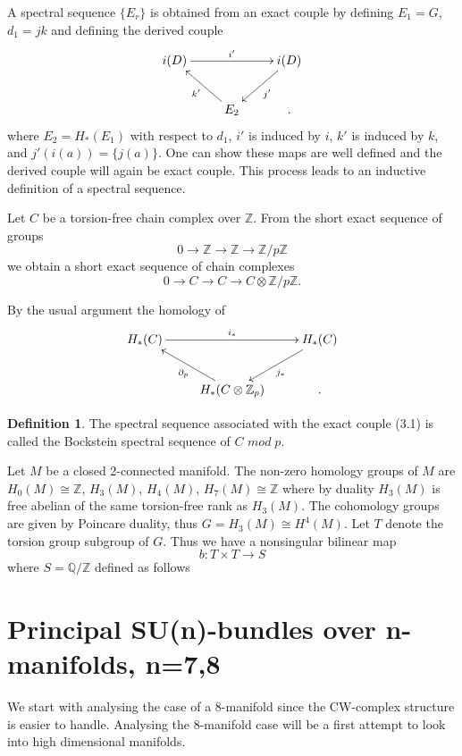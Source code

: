 \documentclass[A4,11pt,oneside]{book}
\theoremstyle{definition}
\newtheorem{defi}{Definition}
\begin{document}
A spectral sequence $\{E_r\}$ is obtained from an exact couple by defining $E_1=G$, $d_1=jk$ and defining the derived couple
\begin{displaymath}
\xymatrix{ 
i(D) \ar[rr]^{i'}& &i(D)\ar[ld]^{j'} \\
 & E_2\ar[lu]^{k'} &.
}
\end{displaymath}
where $E_2=H_{*}(E_1)$ with respect to $d_1$, $i'$ is induced by $i$, $k'$ is induced by $k$, and $j'(i(a))=\{j(a)\}$. One can show these maps are well defined and the derived couple will again be exact couple. This process leads to an inductive definition of a spectral sequence. 

Let $C$ be a torsion-free chain complex over $\mathbb{Z}$. From the short exact sequence of groups
\begin{equation*}
0\longrightarrow\mathbb{Z}\longrightarrow\mathbb{Z}\longrightarrow\mathbb{Z}/p\mathbb{Z}
\end{equation*}
we obtain a short exact sequence of chain complexes
\begin{equation*}
0\longrightarrow C\longrightarrow C\longrightarrow C\otimes\mathbb{Z}/p\mathbb{Z}.
\end{equation*}

By the usual argument the homology of 
\begin{equation}
\xymatrix{ 
H_{*}(C) \ar[rr]^{i_{*}}& &H_{*}(C)\ar[ld]^{j_{*}} \\
 & H_{*}(C\otimes\mathbb{Z}_p)\ar[lu]^{\partial_p} &.
}
\end{equation}

\begin{defi}
The spectral sequence associated with the exact couple (3.1) is called the Bockstein spectral sequence of $C$ $mod\;p$.
\end{defi}

Let $M$ be a closed 2-connected manifold. The non-zero homology groups of $M$ are $H_0(M)\cong\mathbb{Z}$, $H_3(M)$, $H_4(M)$, $H_7(M)\cong\mathbb{Z}$ where by duality $H_3(M)$ is free abelian of the same torsion-free rank as $H_3(M)$. The cohomology groups are given by Poincare duality, thus $G=H_3(M)\cong H^4(M)$.
Let $T$ denote the torsion group subgroup of $G$. Thus we have a nonsingular bilinear map
\begin{equation*}
b:T\times T\rightarrow S
\end{equation*}
where $S=\mathbb{Q}/ \mathbb{Z}$ defined as follows 



\section{Principal SU(n)-bundles over n-manifolds, n=7,8}

We start with analysing the case of a 8-manifold since the CW-complex structure is easier to handle. Analysing the 8-manifold case will be a first attempt to look into high dimensional manifolds. 
\end{document}
